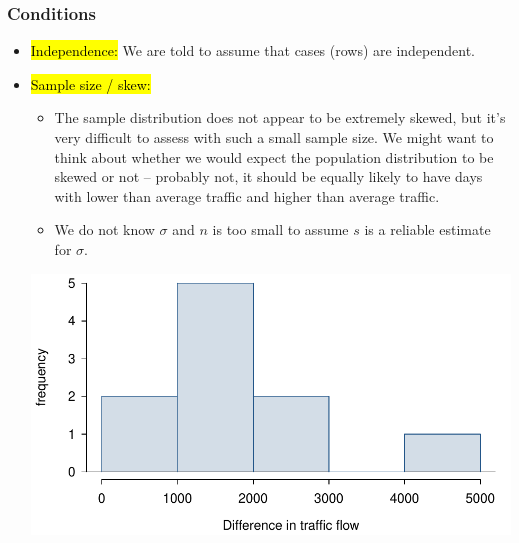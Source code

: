 
\begin{frame}
\frametitle{Conditions}

\begin{itemize}

\item \hl{Independence:} We are told to assume that cases (rows) are independent.

\pause

\item \hl{Sample size / skew:} $\:$ \\

\pause

{
{\tiny
\begin{itemize}

\item The sample distribution does not appear to be extremely skewed, but it's very difficult to assess with such a small sample size. We might want to think about whether we would expect the population distribution to be skewed or not -- probably not, it should be equally likely to have days with lower than average traffic and higher than average traffic.

\item We do not know $\sigma$ and $n$ is too small to assume $s$ is a reliable estimate for $\sigma$.
\end{itemize}
}
}
{
\includegraphics[width=\textwidth]{5-1_one_t/figures/friday/trafficHist}
}

\end{itemize}

$\:$ \\

\pause


\end{frame}

